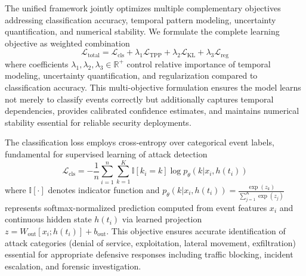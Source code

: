 \documentclass[10pt,journal,compsoc]{IEEEtran}
\newcommand{\R}{\mathbb{R}}
\begin{document}
The unified framework jointly optimizes multiple complementary objectives addressing classification accuracy, temporal pattern modeling, uncertainty quantification, and numerical stability. We formulate the complete learning objective as weighted combination
\begin{equation}
\mathcal{L}_{\text{total}} = \mathcal{L}_{\text{cls}} + \lambda_1 \mathcal{L}_{\text{TPP}} + \lambda_2 \mathcal{L}_{\text{KL}} + \lambda_3 \mathcal{L}_{\text{reg}}
\label{eq:total_loss}
\end{equation}
where coefficients $\lambda_1, \lambda_2, \lambda_3 \in \R^+$ control relative importance of temporal modeling, uncertainty quantification, and regularization compared to classification accuracy. This multi-objective formulation ensures the model learns not merely to classify events correctly but additionally captures temporal dependencies, provides calibrated confidence estimates, and maintains numerical stability essential for reliable security deployments.

The classification loss employs cross-entropy over categorical event labels, fundamental for supervised learning of attack detection
\begin{equation}
\mathcal{L}_{\text{cls}} = -\frac{1}{n}\sum_{i=1}^n \sum_{k=1}^K \mathbb{I}[k_i = k] \log p_\theta(k | x_i, h(t_i))
\end{equation}
where $\mathbb{I}[\cdot]$ denotes indicator function and $p_\theta(k | x_i, h(t_i)) = \frac{\exp(z_k)}{\sum_{j=1}^K \exp(z_j)}$ represents softmax-normalized prediction computed from event features $x_i$ and continuous hidden state $h(t_i)$ via learned projection $z = W_{\text{out}} [x_i; h(t_i)] + b_{\text{out}}$. This objective ensures accurate identification of attack categories (denial of service, exploitation, lateral movement, exfiltration) essential for appropriate defensive responses including traffic blocking, incident escalation, and forensic investigation.
\end{document}
